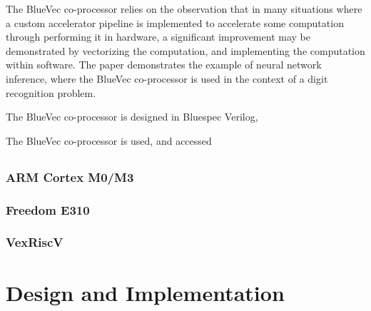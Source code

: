 \documentclass[a4paper,9pt]{report}
\begin{document}
The BlueVec co-processor relies on the observation that in many situations where
a custom accelerator pipeline is implemented to accelerate some computation
through performing it in hardware, a significant improvement may be demonstrated
by vectorizing the computation, and implementing the computation within
software. The paper demonstrates the example of neural network inference, where
the BlueVec co-processor is used in the context of a digit recognition problem.

The BlueVec co-processor is designed in Bluespec Verilog, %

% 
The BlueVec co-processor is used, and accessed 







\section{}




\subsection{ARM Cortex M0/M3}
\subsection{Freedom E310}
\subsection{VexRiscV}

\chapter{Design and Implementation}

\end{document}
